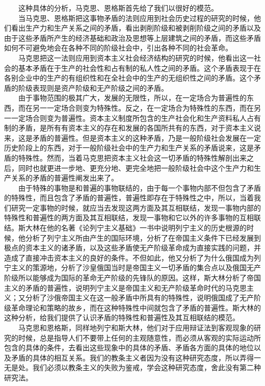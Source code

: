\documentclass[cn,11pt,chinese]{elegantbook}
\begin{document}
　　这种具体的分析，马克思、恩格斯首先给了我们以很好的模范。\\
　　当马克思、恩格斯把这事物矛盾的法则应用到社会历史过程的研究的时候，他们看出生产力和生产关系之间的矛盾，看出剥削阶级和被剥削阶级之间的矛盾以及由于这些矛盾所产生的经济基础和政治及思想等上层建筑之间的矛盾，而这些矛盾如何不可避免地会在各种不同的阶级社会中，引出各种不同的社会革命。\\
　　马克思把这一法则应用到资本主义社会经济结构的研究的时候，他看出这一社会的基本矛盾在于生产的社会性和占有制的私人性之间的矛盾。这个矛盾表现于在各别企业中的生产的有组织性和在全社会中的生产的无组织性之间的矛盾。这个矛盾的阶级表现则是资产阶级和无产阶级之间的矛盾。\\
　　由于事物范围的极其广大，发展的无限性，所以，在一定场合为普遍性的东西，而在另一一定场合则变为特殊性。反之，在一定场合为特殊性的东西，而在另一一定场合则变为普遍性。资本主义制度所包含的生产社会化和生产资料私人占有制的矛盾，是所有有资本主义的存在和发展的各国所共有的东西，对于资本主义说来，这是矛盾的普遍性。但是资本主义的这种矛盾，乃是一般阶级社会发展在一定历史阶段上的东西，对于一般阶级社会中的生产力和生产关系的矛盾说来，这是矛盾的特殊性。然而，当着马克思把资本主义社会这一切矛盾的特殊性解剖出来之后，同时也就更进一步地、更充分地、更完全地把一般阶级社会中这个生产力和生产关系的矛盾的普遍性阐发出来了。\\
　　由于特殊的事物是和普遍的事物联结的，由于每一个事物内部不但包含了矛盾的特殊性，而且包含了矛盾的普遍性，普遍性即存在于特殊性之中，所以，当着我们研究一定事物的时候，就应当去发现这两方面及其互相联结，发现一事物内部的特殊性和普遍性的两方面及其互相联结，发现一事物和它以外的许多事物的互相联结。斯大林在他的名著《论列宁主义基础》一书中说明列宁主义的历史根源的时候，他分析了列宁主义所由产生的国际环境，分析了在帝国主义条件下已经发展到极点的资本主义的诸矛盾，以及这些矛盾使无产阶级革命成为直接实践的问题，并造成了直接冲击资本主义的良好的条件。不但如此，他又分析了为什么俄国成为列宁主义的策源地，分析了沙皇俄国当时是帝国主义一切矛盾的集合点以及俄国无产阶级所以能够成为国际的革命无产阶级的先锋队的原因。这样，斯大林分析了帝国主义的矛盾的普遍性，说明列宁主义是帝国主义和无产阶级革命时代的马克思主义；又分析了沙俄帝国主义在这一般矛盾中所具有的特殊性，说明俄国成了无产阶级革命理论和策略的故乡，而在这种特殊性中间就包含了矛盾的普遍性。斯大林的这种分析，给我们提供了认识矛盾的特殊性和普遍性及其互相联结的模范。\\
　　马克思和恩格斯，同样地列宁和斯大林，他们对于应用辩证法到客观现象的研究的时候，总是指导人们不要带上任何的主观随意性，而必须从客观的实际运动所包含的具体的条件，去看出这些现象中的具体的矛盾、矛盾各方面的具体的地位以及矛盾的具体的相互关系。我们的教条主义者因为没有这种研究态度，所以弄得一无是处。我们必须以教条主义的失败为鉴戒，学会这种研究态度，舍此没有第二种研究法。\\
\end{document}
